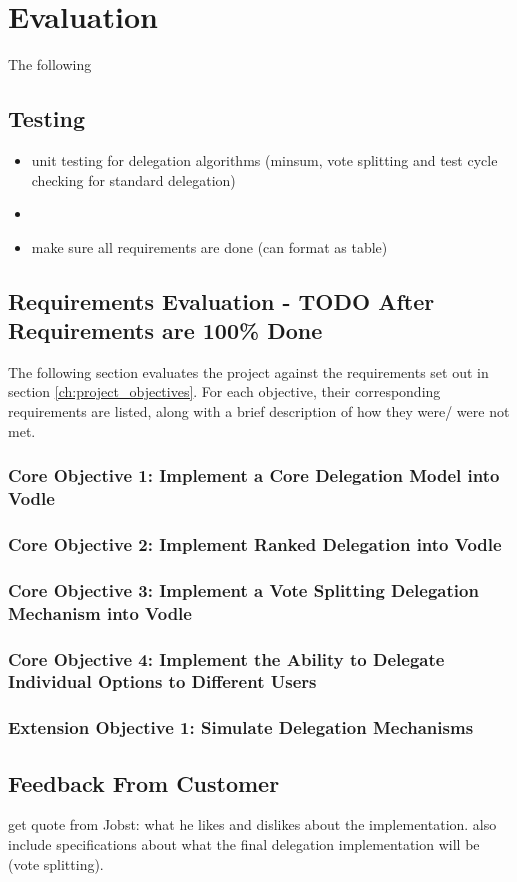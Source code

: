 \chapter{Evaluation}\label{ch:evaluation}
The following 
\section{Testing}
\begin{itemize}
    \item unit testing for delegation algorithms (minsum, vote splitting and test cycle checking for standard delegation)
    \item 
    \item make sure all requirements are done (can format as table)
\end{itemize}
\section{Requirements Evaluation - TODO After Requirements are 100\% Done}
The following section evaluates the project against the requirements set out in section \ref{ch:project_objectives}. For each objective, their corresponding requirements are listed, along with a brief description of how they were/ were not met.

\subsection{Core Objective 1: Implement a Core Delegation Model into Vodle}
\subsection{Core Objective 2: Implement Ranked Delegation into Vodle}
\subsection{Core Objective 3: Implement a Vote Splitting Delegation Mechanism into Vodle}
\subsection{Core Objective 4: Implement the Ability to Delegate Individual Options to Different Users}
\subsection{Extension Objective 1: Simulate Delegation Mechanisms}

\section{Feedback From Customer}
get quote from Jobst: what he likes and dislikes about the implementation. also include specifications about what the final delegation implementation will be (vote splitting).